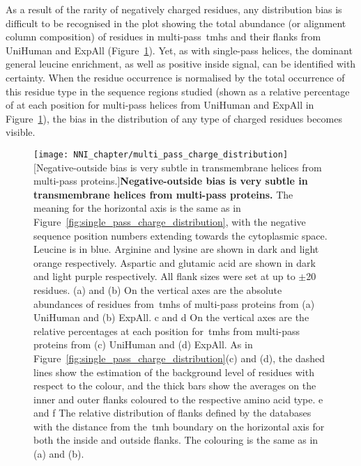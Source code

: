 As a result of the rarity of negatively charged residues, any distribution bias is difficult to be recognised in the plot showing the total abundance (or alignment column composition) of residues in multi-pass~\gls{tmh}s and their flanks from UniHuman and ExpAll (Figure~\ref{fig:multi_pass_charge_distribution}).
Yet, as with single-pass helices, the dominant general leucine enrichment, as well as positive inside signal, can be identified with certainty.
When the residue occurrence is normalised by the total occurrence of this residue type in the sequence regions studied (shown as a relative percentage of at each position for multi-pass helices from UniHuman and ExpAll  in Figure~\ref{fig:multi_pass_charge_distribution}), the bias in the distribution of any type of charged residues becomes visible.

\begin{figure}[!p]
\centering
\texttt{[image: NNI\_chapter/multi\_pass\_charge\_distribution]}
[Negative-outside bias is very subtle in transmembrane helices from multi-pass proteins.]{\textbf{Negative-outside bias is very subtle in transmembrane helices from multi-pass proteins.} The meaning for the horizontal axis is the same as in Figure~\ref{fig:single_pass_charge_distribution}, with the negative sequence position numbers extending towards the cytoplasmic space.
Leucine is in blue.
Arginine and lysine are shown in dark and light orange respectively.
Aspartic and glutamic acid are shown in dark and light purple respectively.
All flank sizes were set at up to $\pm$20 residues.
(a) and (b) On the vertical axes are the absolute abundances of residues from~\gls{tmh}s of multi-pass proteins from (a) UniHuman and (b) ExpAll.
c and d On the vertical axes are the relative percentages at each position for~\gls{tmh}s from multi-pass proteins from (c) UniHuman and (d) ExpAll.
As in Figure~\ref{fig:single_pass_charge_distribution}(c) and (d), the dashed lines show the estimation of the background level of residues with respect to the colour, and the thick bars show the averages on the inner and outer flanks coloured to the respective amino acid type.
e and f The relative distribution of flanks defined by the databases with the distance from the~\gls{tmh} boundary on the horizontal axis for both the inside and outside flanks.
The colouring is the same as in (a) and (b).}

\label{fig:multi_pass_charge_distribution}
\end{figure}

